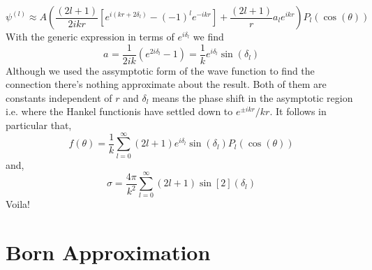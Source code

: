 \begin{equation}
\psi^{(l)} \approx A\left( \frac{(2l + 1)}{2ikr} \left[e^{i(kr + 2\delta_{l})} - {(-1)}^{l}e^{-ikr}\right] + \frac{(2l + 1)}{r}a_{l}e^{ikr} \right) P_{l}(\cos(\theta))
\end{equation}
With the generic expression in terms of $e^{i \delta_{l}}$ we find
\begin{equation}
a_{} = \frac{1}{2ik}(e^{2i \delta_{l}} - 1) = \frac{1}{k} e^{i \delta_{l}} \sin(\delta_{l})
\end{equation}
Although we used the assymptotic form of the wave function to find the connection there's nothing approximate about the result. Both of them are constants independent of $r$ and $\delta_{l}$ means the phase shift in the asymptotic region i.e. where the Hankel functionis have settled down to $e^{\pm ikr}/kr$. It follows in particular that,
\begin{equation}
f(\theta) = \frac{1}{k}\sum_{l=0}^{\infty}(2l + 1)e^{i \delta_{l}} \sin(\delta_{l}) P_{l}(\cos(\theta)) 
\end{equation}
and,
\begin{equation}
\sigma = \frac{4 \pi}{k^{2}} \sum_{l=0}^{\infty}(2l + 1) \sin[2](\delta_{l})
\end{equation}
Voila!
\section{Born Approximation}
